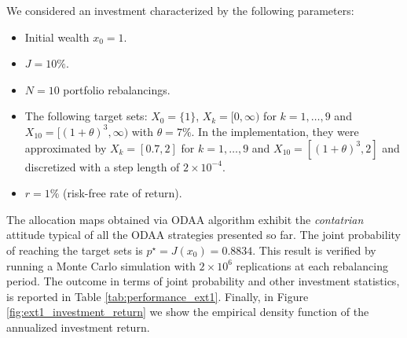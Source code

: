 We considered an investment characterized by the following parameters:
\begin{itemize}
	\item Initial wealth $x_0 = 1$.
	\item $J = 10\%$.
	\item $N = 10$ portfolio rebalancings.
	\item The following target sets: $X_0 = \{1\}$, $X_k = [0,\infty)$ for $k = 1,\ldots,9$ and $X_{10} = [(1+\theta)^3,\infty)$  with $\theta=7\%$. In the implementation, they were approximated by $X_k = [0.7,2]$ for $k = 1,\ldots,9$ and $X_{10} = [(1+\theta)^3,2]$ and discretized with a step length of $2 \times 10^{-4}$.
	\item $r = 1\%$ (risk-free rate of return).
\end{itemize}
The allocation maps obtained via \gls{ODAA} algorithm exhibit the \textit{contatrian} attitude typical of all the \gls{ODAA} strategies presented so far. The joint probability of reaching the target sets is $p^{\star}=J(x_0) = 0.8834$. This result is verified by running a Monte Carlo simulation with $2\times10^6$ replications at each rebalancing period. The outcome in terms of joint probability and other investment statistics, is reported in Table \ref{tab:performance_ext1}. Finally, in Figure \ref{fig:ext1_investment_return} we show the empirical density function of the annualized investment return.






